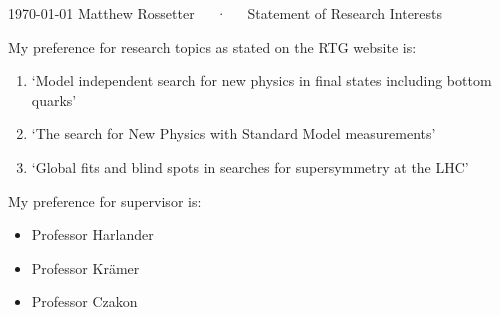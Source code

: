 \documentclass[11pt, a4paper]{awesome-cv}
\begin{document}
\makecvheader[R]

\makecvfooter
  {\today}
  {Matthew Rossetter~~~·~~~Statement of Research Interests}
  {}

\makelettertitle

\begin{cvletter}

\vspace{-30pt}
My preference for research topics as stated on the RTG website is: 
\begin{enumerate}
    \item `Model independent search for new physics in final states including bottom quarks'
    \item `The search for New Physics with Standard Model measurements'
    \item `Global fits and blind spots in searches for supersymmetry at the LHC'
\end{enumerate}
My preference for supervisor is:
\begin{itemize}
    \item Professor Harlander
    \item Professor Kr\"{a}mer
    \item Professor Czakon
\end{itemize}

\end{cvletter}

\makeletterclosing
\end{document}
